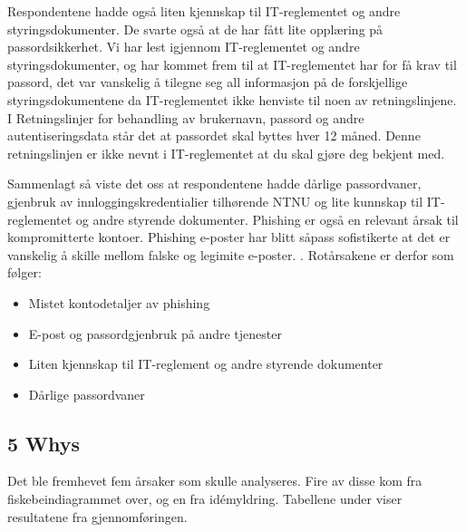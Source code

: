 Respondentene hadde også liten kjennskap til IT-reglementet og andre styringsdokumenter. De svarte også at de har fått lite opplæring på passordsikkerhet. Vi har lest igjennom IT-reglementet og andre styringsdokumenter, og har kommet frem til at IT-reglementet har for få krav til passord, det var vanskelig å tilegne seg all informasjon på de forskjellige styringsdokumentene da IT-reglementet ikke henviste til noen av retningslinjene. I Retningslinjer for behandling av brukernavn, passord og andre autentiseringsdata \cite{RetnBPA} står det at passordet skal byttes hver 12 måned. Denne retningslinjen er ikke nevnt i IT-reglementet at du skal gjøre deg bekjent med. 

Sammenlagt så viste det oss at respondentene hadde dårlige passordvaner, gjenbruk av innloggingskredentialier tilhørende NTNU og lite kunnskap til IT-reglementet og andre styrende dokumenter. Phishing er også en relevant årsak til kompromitterte kontoer. Phishing e-poster har blitt såpass sofistikerte at det er vanskelig å skille mellom falske og legimite e-poster. \cite{SophPhish}. Rotårsakene er derfor som følger: 

\begin{itemize}
    \item Mistet kontodetaljer av phishing
    \item E-post og passordgjenbruk på andre tjenester
    \item Liten kjennskap til IT-reglement og andre styrende dokumenter
    \item Dårlige passordvaner
\end{itemize}

\subsection{5 Whys}
Det ble fremhevet fem årsaker som skulle analyseres. Fire av disse kom fra fiskebeindiagrammet over, og en fra idémyldring. Tabellene under viser resultatene fra gjennomføringen. 

